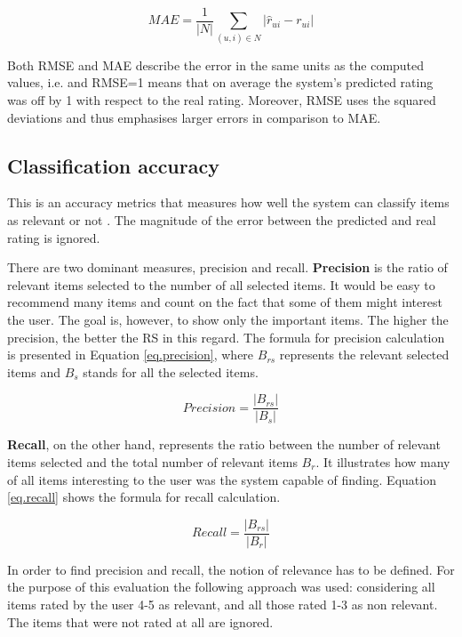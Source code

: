 \documentclass[12pt]{report}
\begin{document}
\begin{equation}
MAE = \frac{1}{|N|} \displaystyle\sum_{(u,i) \in N} |\hat{r}_{ui} - r_{ui}|
\label{eq.mae}
\end{equation}
\hbox{}

Both RMSE and MAE describe the error in the same units as the computed values, i.e. and RMSE=1 means that on average the system's predicted rating was off by 1 with respect to the real rating. Moreover, RMSE uses the squared deviations and thus emphasises larger errors in comparison to MAE.

\subsection{Classification accuracy}

This is an accuracy metrics that measures how well the system can classify items as relevant or not \cite{eval_twente}. The magnitude of the error between the predicted and real rating is ignored.

There are two dominant measures, precision and recall. {\bf Precision} is the ratio of relevant items selected to the number of all selected items. It would be easy to recommend many items and count on the fact that some of them might interest the user. The goal is, however, to show only the important items. The higher the precision, the better the RS in this regard. The formula for precision calculation is presented in Equation \ref{eq.precision}, where $B_{rs}$ represents the relevant selected items and $B_s$ stands for all the selected items.

\begin{equation}
Precision = \frac{|B_{rs}|}{|B_{s}|}
\label{eq.precision}
\end{equation}
\hbox{}

{\bf Recall}, on the other hand, represents the ratio between the number of relevant items selected and the total number of relevant items $B_r$. It illustrates how many of all items interesting to the user was the system capable of finding. Equation \ref{eq.recall} shows the formula for recall calculation.

\begin{equation}
Recall = \frac{|B_{rs}|}{|B_{r}|}
\label{eq.recall}
\end{equation}
\hbox{}

In order to find precision and recall, the notion of relevance has to be defined. For the purpose of this evaluation the following approach was used: considering all items rated by the user 4-5 as relevant, and all those rated 1-3 as non relevant. The items that were not rated at all are ignored.
\end{document}

